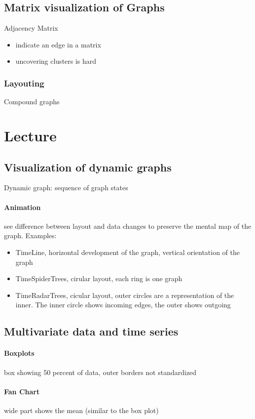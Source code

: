 \documentclass[ngerman]{scrartcl}
\begin{document}
\subsection{Matrix visualization of Graphs}
Adjacency Matrix
\begin{itemize}
  \item indicate an edge in a matrix
  \item uncovering clusters is hard
\end{itemize}
\subsubsection*{Layouting}
Compound graphs

\section{Lecture}
\subsection{Visualization of dynamic graphs}
Dynamic graph: sequence of graph states
\paragraph{Animation} see difference between layout and data changes to preserve the mental map of the graph. Examples:
\begin{itemize}
  \item TimeLine, horizontal development of the graph, vertical orientation of the graph  
  \item TimeSpiderTrees, cirular layout, each ring is one graph
  \item TimeRadarTrees, cicular layout, outer circles are a representation of the inner. The inner circle shows incoming edges, the outer shows outgoing
\end{itemize}

\subsection{Multivariate data and time series}
\paragraph{Boxplots} box showing 50 percent of data, outer borders not standardized
\paragraph{Fan Chart} wide part shows the mean (similar to the box plot) 
\end{document}

